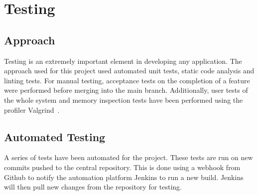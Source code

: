 \chapter{Testing}






\section{Approach}
Testing is an extremely important element in developing any application. The approach used for this project used automated unit tests, static code analysis and \gls{linting} tests. For manual testing, acceptance tests on the completion of a feature were performed before merging into the main branch. Additionally, user tests of the whole system and memory inspection tests have been performed using the profiler Valgrind~\cite{valgrind}.

\section{Automated Testing}
A series of tests have been automated for the project. These tests are run on new commits pushed to the central repository. This is done using a webhook from Github to notify the automation platform Jenkins to run a new build. Jenkins\cite{jenkins} will then pull new changes from the repository for testing. 

